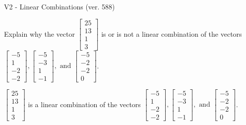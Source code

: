 \begin{exercise}
  \begin{exerciseTitle}V2 - Linear Combinations (ver. 588)\end{exerciseTitle}
  \begin{exerciseStatement}
    Explain why the vector \(\left[\begin{array}{c}
25 \\
13 \\
1 \\
3
\end{array}\right]\)  is or is not a linear 
	combination of the vectors \(\left[\begin{array}{c}
-5 \\
1 \\
-2 \\
-2
\end{array}\right] , \left[\begin{array}{c}
-5 \\
-3 \\
1 \\
-1
\end{array}\right] , \text{ and } \left[\begin{array}{c}
-5 \\
-2 \\
-2 \\
0
\end{array}\right]\).
	


  \end{exerciseStatement}
  \begin{exerciseAnswer}
   \(\left[\begin{array}{c}
25 \\
13 \\
1 \\
3
\end{array}\right]\) 
  	 is  
	a linear combination of the vectors \(\left[\begin{array}{c}
-5 \\
1 \\
-2 \\
-2
\end{array}\right] , \left[\begin{array}{c}
-5 \\
-3 \\
1 \\
-1
\end{array}\right] , \text{ and } \left[\begin{array}{c}
-5 \\
-2 \\
-2 \\
0
\end{array}\right]\).

	
  


  \end{exerciseAnswer}
\end{exercise}